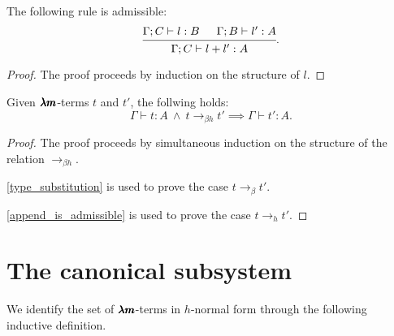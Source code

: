 \begin{lemma}%
  \label{append_is_admissible}
  The following rule is admissible:
  \[
    \begin{prooftree}
      \hypo{ \Gamma ; C \vdash l:B }
      \hypo{ \Gamma ; B \vdash l':A }
      \infer2{ \Gamma ; C \vdash  l+l' : A }
    \end{prooftree}.
  \]
\end{lemma}
\begin{proof}
  The proof proceeds by induction on the structure of $l$.
\end{proof}


\begin{theorem}
  \label{type_preservation}
  Given $\pmb{\lambda m}$-terms $t$ and $t'$, the follwing holds:
  \[
    \Gamma \vdash t : A \ \land \ t \to_{\beta h} t' \implies \Gamma \vdash t' : A.
  \]
\end{theorem}
\begin{proof}
  The proof proceeds by simultaneous induction on the structure of the relation $\to_{\beta h}$.

  \cref{type_substitution} is used to prove the case $t \to_\beta t'$.

  \cref{append_is_admissible} is used to prove the case $t \to_h t'$.
\end{proof}


\section{The canonical subsystem}

We identify the set of $\pmb{\lambda m}$-terms in $h$-normal form through the following inductive definition.


